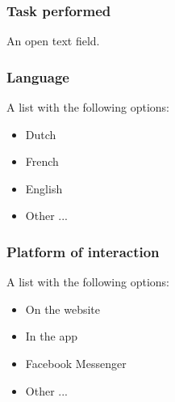 \begin{appendices}
	\subsubsection{Task performed}
	An open text field.
	\subsubsection{Language}
	A list with the following options:
	\begin{itemize}
		\item Dutch
		\item French
		\item English
		\item Other ...
	\end{itemize}
	\subsubsection{Platform of interaction}
	A list with the following options:
	\begin{itemize}
		\item On the website
		\item In the app
		\item Facebook Messenger
		\item Other ...
	\end{itemize}
	

\end{appendices}
